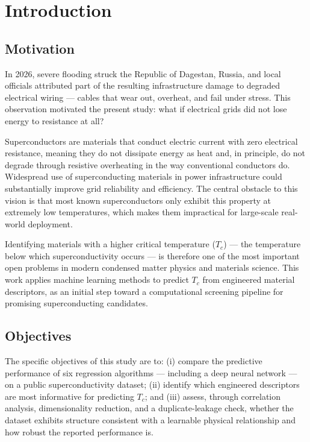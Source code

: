 \documentclass[11pt]{article}
\begin{document}
\section{Introduction}

\subsection{Motivation}
In 2026, severe flooding struck the Republic of Dagestan, Russia, and local officials attributed part of
the resulting infrastructure damage to degraded electrical wiring --- cables that wear out, overheat, and
fail under stress. This observation motivated the present study: what if electrical grids did not lose
energy to resistance at all?

Superconductors are materials that conduct electric current with zero electrical resistance, meaning they
do not dissipate energy as heat and, in principle, do not degrade through resistive overheating in the way
conventional conductors do. Widespread use of superconducting materials in power infrastructure could
substantially improve grid reliability and efficiency. The central obstacle to this vision is that most
known superconductors only exhibit this property at extremely low temperatures, which makes them
impractical for large-scale real-world deployment.

Identifying materials with a higher critical temperature ($T_c$) --- the temperature below which
superconductivity occurs --- is therefore one of the most important open problems in modern condensed
matter physics and materials science. This work applies machine learning methods to predict $T_c$ from
engineered material descriptors, as an initial step toward a computational screening pipeline for
promising superconducting candidates.

\subsection{Objectives}
The specific objectives of this study are to: (i) compare the predictive performance of six regression
algorithms --- including a deep neural network --- on a public superconductivity dataset; (ii) identify
which engineered descriptors are most informative for predicting $T_c$; and (iii) assess, through
correlation analysis, dimensionality reduction, and a duplicate-leakage check, whether the dataset
exhibits structure consistent with a learnable physical relationship and how robust the reported
performance is.
\end{document}
